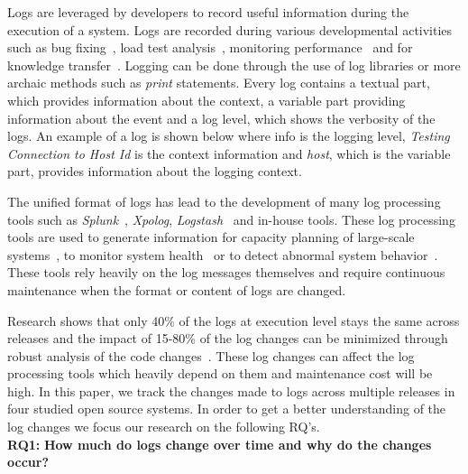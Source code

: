 Logs are leveraged by developers to record useful information during the execution of a system. Logs are recorded during various developmental activities such as bug fixing~\cite{ConsoleLogs,JGLouMining,QFuanomaly}, load test analysis~\cite{Automatic}, monitoring performance~\cite{Yuan} and for knowledge transfer~\cite{IanWCRE}.
Logging can be done through the use of log libraries or more archaic methods such as \textsl{print} statements. Every log contains a textual part, which provides information about the context, a variable part providing information about the event and a log level, which shows the verbosity of the logs. An example of a log is shown below where info is the logging level, \textsl{Testing Connection to Host Id} is the context information and \textsl{host}, which is the variable part, provides information about the logging context.

The unified format of logs has lead to the development of many log processing tools such as \textsl{Splunk}~\cite{carasso2012exploring}, \textsl{Xpolog}, \textsl{Logstash}~\cite{xu2013detecting} and in-house tools. These log processing tools are used to generate information for capacity planning of large-scale systems~\cite{hassan2008industrial,nagappan2009efficiently}, to monitor system health~\cite{bitincka2010optimizing} or to detect abnormal system behavior~\cite{JiangICSM2008}. These tools rely heavily on the log messages themselves and require continuous maintenance when the format or content of logs are changed. 


Research shows that only 40\% of the logs at execution level stays the same across releases and the impact of 15-80\% of the log changes can be minimized through robust analysis of the code changes~\cite{IanWCRE}. These log changes can affect the log processing tools which heavily depend on them and maintenance cost will be high. In this paper, we track the changes made to logs across multiple releases in four studied open source systems. In order to get a better understanding of the log changes we focus our research on the following RQ's.\\


\textbf{RQ1:} \textbf{How much do logs change over time and why do the changes occur?}

